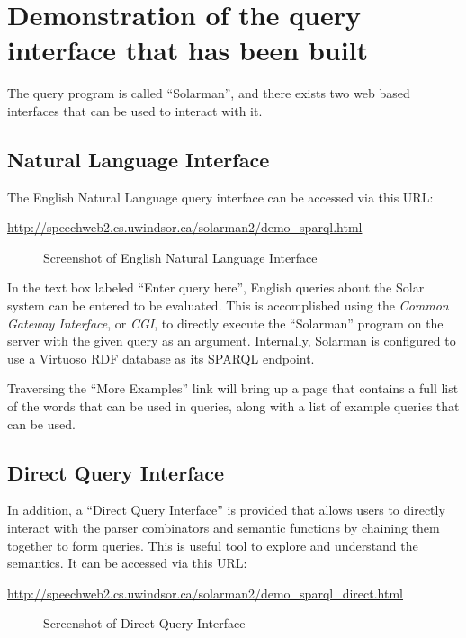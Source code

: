 \documentclass[../main.tex]{subfiles}
\begin{document}
\chapter{Demonstration of the query interface that has been built}

The query program is called ``Solarman'', and there exists two web based interfaces that can be used to interact with it.

\section{Natural Language Interface}

The English Natural Language query interface can be accessed via this URL:

\url{http://speechweb2.cs.uwindsor.ca/solarman2/demo_sparql.html}


\begin{figure}[h]
\centering
{}
\caption{Screenshot of English Natural Language Interface}
\end{figure}
In the text box labeled ``Enter query here'', English queries about the Solar system can be entered to be evaluated.  This is accomplished using the {\em Common Gateway Interface}, or {\em CGI}, to directly execute the ``Solarman'' program on the server with the given query as an argument.  Internally, Solarman is configured to use a Virtuoso \cite{virtuoso} RDF database as its SPARQL endpoint.

Traversing the ``More Examples'' link will bring up a page that contains a full list of the words that can be used in queries, along with a list of example queries that can be used.


\section{Direct Query Interface}

In addition, a ``Direct Query Interface'' is provided that allows users to directly interact with the parser combinators and semantic functions by chaining them together to form queries.  This is useful tool to explore and understand the semantics.  It can be accessed via this URL:

\url{http://speechweb2.cs.uwindsor.ca/solarman2/demo_sparql_direct.html}

\begin{figure}[h]
	\centering
	\caption{Screenshot of Direct Query Interface}
\end{figure}
\end{document}
